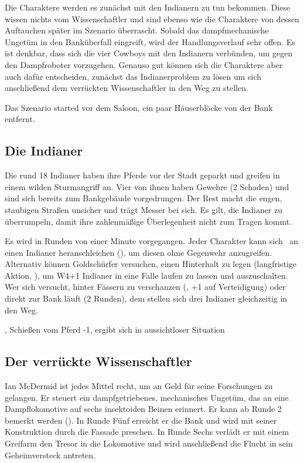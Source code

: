 {		Die Charaktere werden es zunächst mit den Indianern zu tun bekommen. Diese wissen nichts vom Wissenschaftler und sind ebenso wie die Charaktere von dessen Auftauchen später im Szenario überrascht. Sobald das dampfmechanische Ungetüm in den Banküberfall eingreift, wird der Handlungsverlauf sehr offen. Es ist denkbar, dass sich die vier Cowboys mit den Indianern verbünden, um gegen den Dampfroboter vorzugehen. Genauso gut können sich die Charaktere aber auch dafür entscheiden, zunächst das Indianerproblem zu lösen um sich anschließend dem verrückten Wissenschaftler in den Weg zu stellen.

		Das Szenario started vor dem Saloon, ein paar Häuserblöcke von der Bank entfernt.

		\subsection{Die Indianer}

		Die rund 18 Indianer haben ihre Pferde vor der Stadt geparkt und greifen in einem wilden Sturmangriff an. Vier von ihnen haben Gewehre (2 Schaden) und sind sich bereits zum Bankgebäude vorgedrungen. Der Rest macht die engen, staubigen Straßen unsicher und trägt Messer bei sich. Es gilt, die Indianer zu überrumpeln, damit ihre zahlenmäßige Überlegenheit nicht zum Tragen kommt.

		Es wird in Runden von einer Minute vorgegangen. Jeder Charakter kann sich \zB\ an einen Indianer heranschleichen (), um diesen ohne Gegenwehr anzugreifen. Alternativ können Goldschürfer versuchen, einen Hinterhalt zu legen (langfristige Aktion, ), um W4+1 Indianer in eine Falle laufen zu lassen und auszuschalten. Wer sich versucht, hinter Fässern zu verschanzen (, +1 auf Verteidigung) oder direkt zur Bank läuft (2 Runden), dem stellen sich drei Indianer gleichzeitig in den Weg.

		, Schießen vom Pferd -1, ergibt sich in aussichtloser Situation

		\subsection{Der verrückte Wissenschaftler}

		Ian McDermid ist jedes Mittel recht, um an Geld für seine Forschungen zu gelangen. Er steuert ein dampfgetriebenes, mechanisches Ungetüm, das an eine Dampflokomotive auf sechs insektoiden Beinen erinnert. Er kann ab Runde 2 bemerkt werden (). In Runde Fünf erreicht er die Bank und wird mit seiner Konstruktion durch die Fassade preschen. In Runde Sechs verlädt er mit einem Greifarm den Tresor in die Lokomotive und wird anschließend die Flucht in sein Geheimversteck antreten.

}
